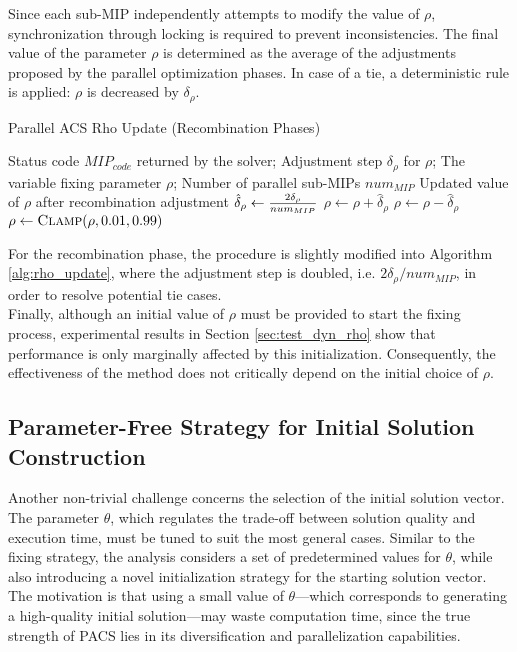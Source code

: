 Since each sub-MIP independently attempts to modify the value of $\rho$, synchronization through locking is required to prevent inconsistencies. The final value of the parameter $\rho$ is determined as the average of the adjustments proposed by the parallel optimization phases. In case of a tie, a deterministic rule is applied: $\rho$ is decreased by $\delta_\rho$.  
\begin{algorithm}[H]
\caption{Parallel ACS Rho Update (Recombination Phases)}\label{alg:rho_update}
\begin{algorithmic}[1]
\Require Status code $MIP_{code}$ returned by the solver; Adjustment step $\delta_\rho$ for $\rho$; The variable fixing parameter $\rho$; Number of parallel sub-MIPs $num_{MIP}$
\Ensure Updated value of $\rho$ after recombination adjustment
    \State $\hat\delta_\rho \gets {2\delta_\rho \over{num_{MIP}}}$
        \State $\rho \gets \rho + \hat\delta_\rho$
    \EndIf
        \State $\rho \gets \rho - \hat\delta_\rho$
    \EndIf
    \State $\rho \gets \Call{Clamp}{\rho,0.01,0.99}$
\EndFunction
\end{algorithmic}
\end{algorithm}
For the recombination phase, the procedure is slightly modified into Algorithm \ref{alg:rho_update}, where the adjustment step is doubled, i.e. $2\delta_\rho / num_{MIP}$, in order to resolve potential tie cases.\\
Finally, although an initial value of $\rho$ must be provided to start the fixing process, experimental results in Section \ref{sec:test_dyn_rho} show that performance is only marginally affected by this initialization. Consequently, the effectiveness of the method does not critically depend on the initial choice of $\rho$.

\subsection{Parameter-Free Strategy for Initial Solution Construction}\label{sec:init_sol_maxFeas}
Another non-trivial challenge concerns the selection of the initial solution vector. The parameter $\theta$, which regulates the trade-off between solution quality and execution time, must be tuned to suit the most general cases. Similar to the fixing strategy, the analysis considers a set of predetermined values for $\theta$, while also introducing a novel initialization strategy for the starting solution vector.  
The motivation is that using a small value of $\theta$---which corresponds to generating a high-quality initial solution---may waste computation time, since the true strength of PACS lies in its diversification and parallelization capabilities.  


